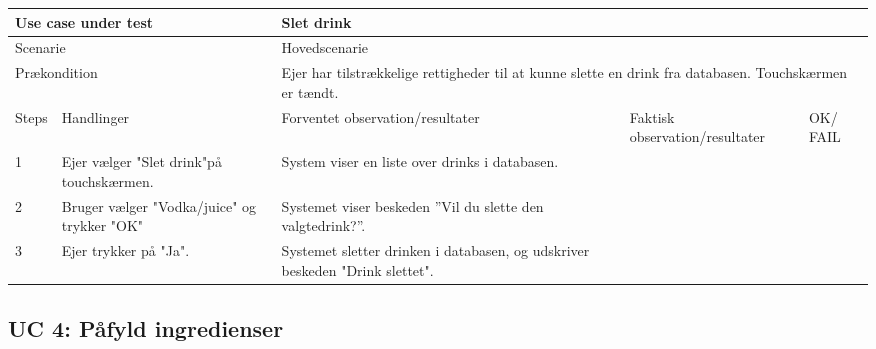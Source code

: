 \begin{table}[H]
\begin{tabular}{|p{1cm}|p{4cm}|p{4cm}|p{4cm}|p{1cm}|}
\hline
\multicolumn{2}{|p{5cm}|}{Use case under test} & \multicolumn{3}{p{9cm}|}{Slet drink}                                       \\ \hline
\multicolumn{2}{|p{5cm}|}{Scenarie}            & \multicolumn{3}{p{9cm}|}{Hovedscenarie}                                          \\ \hline
\multicolumn{2}{|p{5cm}|}{Prækondition}        & \multicolumn{3}{p{9cm}|}{Ejer har tilstrækkelige rettigheder til at kunne slette en drink fra databasen. Touchskærmen er tændt.}                                 \\ \hline
Steps               & Handlinger          & Forventet observation/resultater & Faktisk observation/resultater & OK/ FAIL \\ \hline
1    & Ejer vælger "Slet drink"på touchskærmen.  & System viser en liste over drinks i databasen. &   &         \\ \hline
2    & Bruger vælger "Vodka/juice" og trykker "OK"  & Systemet viser beskeden ”Vil du slette den valgtedrink?”.  &   &         \\ \hline
3    & Ejer trykker på "Ja".  & Systemet sletter drinken i databasen, og udskriver beskeden "Drink slettet".  &   &         \\ \hline

\end{tabular}
\end{table}

\subsection{UC 4: Påfyld ingredienser}

